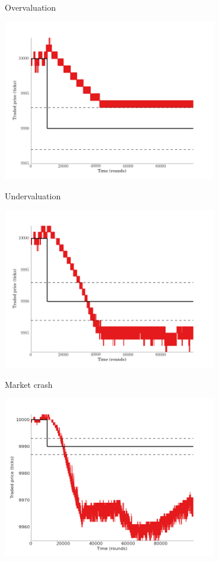 \documentclass[14pt]{beamer}
\begin{document}
\begin{frame}{Overvaluation}
\begin{center}
\includegraphics[width=0.7\textwidth]{market_cases/d_never_reach_fundamental.png}
\end{center}
\end{frame}

\begin{frame}{Undervaluation}
\begin{center}
\includegraphics[width=0.7\textwidth]{market_cases/e_stable_under_fundamental.png}
\end{center}
\end{frame}

\begin{frame}{Market crash}
\begin{center}
\includegraphics[width=0.7\textwidth]{market_cases/f_crash.png}
\end{center}
\end{frame}
\end{document}
